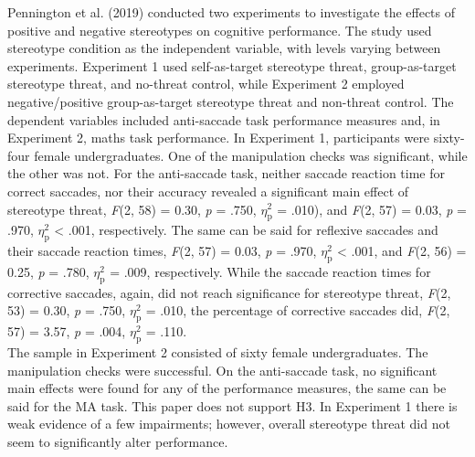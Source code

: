 \documentclass[
  stu, a4paper, 12pt,mask,floatsintext]{apa7}
\begin{document}
Pennington et al. (2019) conducted two experiments to investigate the effects of positive and negative stereotypes on cognitive performance.
The study used stereotype condition as the independent variable, with levels varying between experiments.
Experiment 1 used self-as-target stereotype threat, group-as-target stereotype threat, and no-threat control, while Experiment 2 employed negative/positive group-as-target stereotype threat and non-threat control.
The dependent variables included anti-saccade task performance measures and, in Experiment 2, maths task performance.
In Experiment 1, participants were sixty-four female undergraduates.
One of the manipulation checks was significant, while the other was not.
For the anti-saccade task, neither saccade reaction time for correct saccades, nor their accuracy revealed a significant main effect of stereotype threat, \emph{F}(2, 58) = 0.30, \emph{p} = .750, \(\eta^{2}_{\text{p}}\) = .010), and \emph{F}(2, 57) = 0.03, \emph{p} = .970, \(\eta^{2}_{\text{p}}\) \textless{} .001, respectively.
The same can be said for reflexive saccades and their saccade reaction times, \emph{F}(2, 57) = 0.03, \emph{p} = .970, \(\eta^{2}_{\text{p}}\) \textless{} .001, and \emph{F}(2, 56) = 0.25, \emph{p} = .780, \(\eta^{2}_{\text{p}}\) = .009, respectively.
While the saccade reaction times for corrective saccades, again, did not reach significance for stereotype threat, \emph{F}(2, 53) = 0.30, \emph{p} = .750, \(\eta^{2}_{\text{p}}\) = .010, the percentage of corrective saccades did, \emph{F}(2, 57) = 3.57, \emph{p} = .004, \(\eta^{2}_{\text{p}}\) = .110.\\
The sample in Experiment 2 consisted of sixty female undergraduates.
The manipulation checks were successful.
On the anti-saccade task, no significant main effects were found for any of the performance measures, the same can be said for the MA task.
This paper does not support H3. In Experiment 1 there is weak evidence of a few impairments; however, overall stereotype threat did not seem to significantly alter performance.
\end{document}
